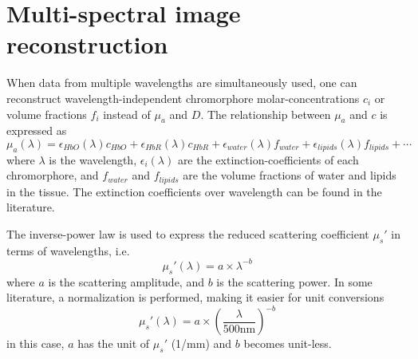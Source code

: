 \documentclass[12pt]{book}               %
\begin{document}
\section{Multi-spectral image reconstruction}
When data from multiple wavelengths are simultaneously used, one can reconstruct wavelength-independent chromorphore molar-concentrations $c_i$ or volume fractions $f_i$ instead of $\mu_a$ and $D$. The relationship between $\mu_a$ and $c$ is expressed as
\begin{equation}
\mu_a(\lambda)=\epsilon_{HbO}(\lambda)c_{HbO}+\epsilon_{HbR}(\lambda)c_{HbR}+\epsilon_{water}(\lambda)f_{water}+\epsilon_{lipids}(\lambda)f_{lipids}+ \cdots
\end{equation}
where $\lambda$ is the wavelength, $\epsilon_i(\lambda)$ are the extinction-coefficients of each chromorphore, and $f_{water}$ and $f_{lipids}$ are the volume fractions of water and lipids in the tissue. The extinction coefficients over wavelength can be found in the literature. 

The inverse-power law is used to express the reduced scattering coefficient $\mu_s'$ in terms of wavelengths, i.e.
\begin{equation}
\mu_s'(\lambda)=a\times\lambda^{-b}
\end{equation}
where $a$ is the scattering amplitude, and $b$ is the scattering power. In some literature, a normalization is performed, making it easier for unit conversions
\begin{equation}
\mu_s'(\lambda)=a\times\left(\frac{\lambda}{500 \mathrm{nm}}\right)^{-b}
\end{equation}
in this case, $a$ has the unit of $\mu_s'$ (1/mm) and $b$ becomes unit-less.
\end{document}
